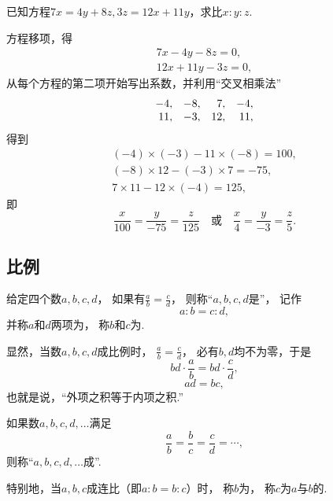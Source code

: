 \begin{example}
已知方程\(7x=4y+8z, 3z=12x+11y\)，求比\(x:y:z\).
\begin{solution}
方程移项，得\begin{gather*}
	7x-4y-8z=0, \\
	12x+11y-3z=0,
\end{gather*}
从每个方程的第二项开始写出系数，并利用“交叉相乘法”
\[
	\begin{array}{*4r}
		-4, & -8, & 7, & -4, \\
		11, & -3, & 12, & 11,
	\end{array}
\]
得到\begin{gather*}
	(-4)\times(-3)-11\times(-8)=100, \\
	(-8)\times12-(-3)\times7=-75, \\
	7\times11-12\times(-4)=125,
\end{gather*}
即\[
	\frac{x}{100}=\frac{y}{-75}=\frac{z}{125}
	\quad\text{或}\quad
	\frac{x}{4}=\frac{y}{-3}=\frac{z}{5}.
\]
\end{solution}
\end{example}

\subsection{比例}
\begin{definition}
给定四个数\(a,b,c,d\)，
如果有\(\frac{a}{b}=\frac{c}{d}\)，
则称“\(a,b,c,d\)是”，
记作\[
	a:b = c:d,
\]
并称\(a\)和\(d\)两项为，
称\(b\)和\(c\)为.
\end{definition}

显然，当数\(a,b,c,d\)成比例时，
\(\frac{a}{b}=\frac{c}{d}\)，
必有\(b,d\)均不为零，于是\[
	bd \cdot \frac{a}{b} = bd \cdot \frac{c}{d},
\]\[
	ad = bc,
\]
也就是说，“外项之积等于内项之积.”

\begin{definition}
如果数\(a,b,c,d,\dotsc\)满足\[
	\frac{a}{b} = \frac{b}{c} = \frac{c}{d} = \dotsb,
\]
则称“\(a,b,c,d,\dotsc\)成”.

特别地，当\(a,b,c\)成连比（即\(a:b = b:c\)）时，
称\(b\)为，
称\(c\)为\(a\)与\(b\)的.
\end{definition}

